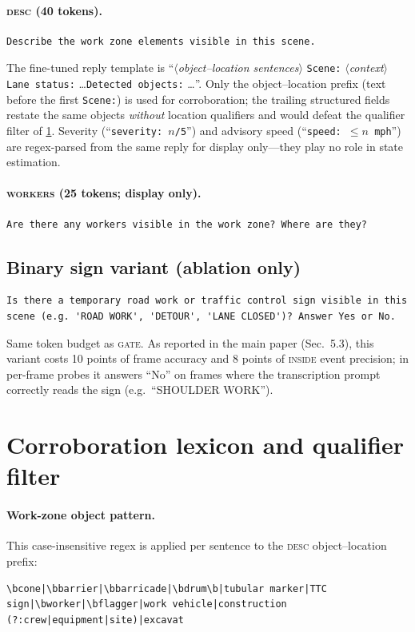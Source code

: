 \documentclass[10pt,twocolumn,letterpaper]{article}
\begin{document}
\paragraph{\textsc{desc} (40 tokens).}
\begin{lstlisting}
Describe the work zone elements visible in this scene.
\end{lstlisting}
The fine-tuned reply template is ``\emph{$\langle$object--location sentences$\rangle$} \texttt{Scene:} \emph{$\langle$context$\rangle$} \texttt{Lane status:} \dots \texttt{Detected objects:} \dots''.  Only the object--location prefix (text before the first \texttt{Scene:}) is used for corroboration; the trailing structured fields restate the same objects \emph{without} location qualifiers and would defeat the qualifier filter of \cref{supp:lexicon}.  Severity (``\texttt{severity: $n$/5}'') and advisory speed (``\texttt{speed: $\leq n$ mph}'') are regex-parsed from the same reply for display only---they play no role in state estimation.

\paragraph{\textsc{workers} (25 tokens; display only).}
\begin{lstlisting}
Are there any workers visible in the work zone? Where are they?
\end{lstlisting}

\subsection{Binary sign variant (ablation only)}
\label{supp:binary}
\begin{lstlisting}
Is there a temporary road work or traffic control sign visible in this scene (e.g. 'ROAD WORK', 'DETOUR', 'LANE CLOSED')? Answer Yes or No.
\end{lstlisting}
Same token budget as \textsc{gate}.  As reported in the main paper (Sec.~5.3), this variant costs 10 points of frame accuracy and 8 points of \textsc{inside} event precision; in per-frame probes it answers ``No'' on frames where the transcription prompt correctly reads the sign (e.g.\ ``SHOULDER WORK'').

\section{Corroboration lexicon and qualifier filter}
\label{supp:lexicon}

\paragraph{Work-zone object pattern.}  This case-insensitive regex is applied per sentence to the \textsc{desc} object--location prefix:
\begin{lstlisting}
\bcone|\bbarrier|\bbarricade|\bdrum\b|tubular marker|TTC sign|\bworker|\bflagger|work vehicle|construction (?:crew|equipment|site)|excavat
\end{lstlisting}
\end{document}

